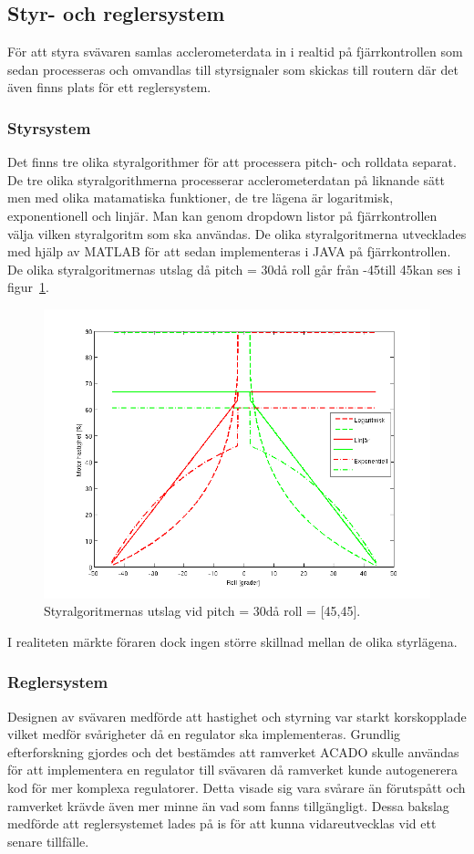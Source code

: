 \subsection{Styr- och reglersystem}
För att styra svävaren samlas acclerometerdata in i realtid på fjärrkontrollen som sedan processeras och omvandlas till styrsignaler som skickas till routern där det även finns plats för ett reglersystem.

\subsubsection{Styrsystem}
Det finns tre olika styralgorithmer för att processera pitch- och rolldata separat. De tre olika styralgorithmerna processerar acclerometerdatan på liknande sätt men med olika matamatiska funktioner, de tre lägena är logaritmisk, exponentionell och linjär. Man kan genom dropdown listor på fjärrkontrollen välja vilken styralgoritm som ska användas. De olika styralgoritmerna utvecklades med hjälp av MATLAB för att sedan implementeras i JAVA på fjärrkontrollen. De olika styralgoritmernas utslag då pitch = 30\degree då roll går från -45\degree till 45\degree kan ses i figur~\ref{fig:styralgoritmer}.

\begin{figure}[htbp!]
\centering
\includegraphics[width=12cm]{../../includes/figures/Styralgoritmer}
\caption{Styralgoritmernas utslag vid pitch = 30\degree då roll = [45,45].}
\label{fig:styralgoritmer}
\end{figure}

I realiteten märkte föraren dock ingen större skillnad mellan de olika styrlägena. 

\subsubsection{Reglersystem}
Designen av svävaren medförde att hastighet och styrning var starkt korskopplade vilket medför svårigheter då en regulator ska implementeras. Grundlig efterforskning gjordes och det bestämdes att ramverket ACADO skulle användas för att implementera en regulator till svävaren då ramverket kunde autogenerera kod för mer komplexa regulatorer. Detta visade sig vara svårare än förutspått och ramverket krävde även mer minne än vad som fanns tillgängligt. Dessa bakslag medförde att reglersystemet lades på is för att kunna vidareutvecklas vid ett senare tillfälle.
